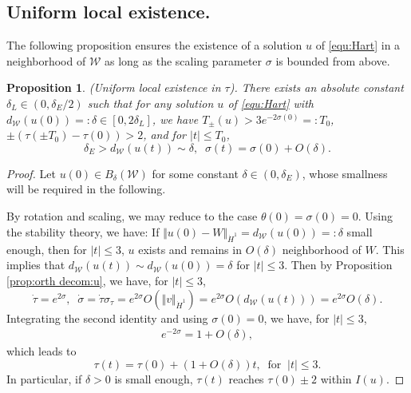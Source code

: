 \documentclass[reqno, 11pt]{amsart}
\numberwithin{equation}{section}
\theoremstyle{plain}
\newtheorem{proposition}[theorem]{Proposition}
\theoremstyle{definition}
\numberwithin{equation}{section}
\numberwithin{theorem}{section}
\numberwithin{equation}{section}
\numberwithin{equation}{section}
\numberwithin{theorem}{section}
\begin{document}
	\subsection{Uniform local existence.}
	The following proposition ensures the existence of a solution $u$ of \eqref{equ:Hart} in a neighborhood of $\mathcal{W}$ as long as the scaling parameter $\sigma$ is bounded from above.
	\begin{proposition}(Uniform local existence in $\tau$)\label{prop:unif lwp}. There exists an absolute constant $\delta_L\in(0,\delta_{E}/2)$ such that for any solution $u$ of \eqref{equ:Hart} with $d_{\mathcal{W}}(u(0))=:\delta\in\left[ 0,2\delta_L \right]$, we have $T_{\pm}(u)>3e^{-2\sigma(0)}=:T_0$, $\pm\left( \tau(\pm T_0)-\tau(0) \right)>2$, and for $|t|\leq T_0$,
		\begin{equation*}
		\delta_{E}>d_{\mathcal{W}}(u(t))\sim\delta,\;\; \sigma(t)=\sigma(0)+O(\delta).
		\end{equation*}
	\end{proposition}
	\begin{proof} Let $u(0)\in B_\delta(\mathcal{W})$ for some constant $\delta\in(0,\delta_{E})$, whose smallness will be required in the following. 
		
		By rotation and scaling, we may reduce to the case $\theta(0)=\sigma(0)=0$. Using the stability theory, we have: If $\Vert u(0)-W \Vert_{\dot H^1}=d_\mathcal{W}(u(0))=:\delta$ small enough, then for $|t|\leq3$, $u$ exists and remains in $O(\delta)$ neighborhood of $W$. This implies that $d_\mathcal{W}(u(t))\sim d_\mathcal{W}(u(0))=\delta$ for $|t|\leq3$. Then by Proposition \ref{prop:orth decom:u}, we have, for $|t|\leq3$,
		\begin{equation*}
		\dot\tau=e^{2\sigma},\;\; \dot\sigma=\dot\tau\sigma_{\tau}=e^{2\sigma}O(\Vert v \Vert_{\dot H^1})=e^{2\sigma}O(d_\mathcal{W}(u(t)))=e^{2\sigma}O(\delta).
		\end{equation*}
		Integrating the second identity and using $\sigma(0)=0$, we have, for $|t|\leq3$,
		\begin{align*}
		e^{-2\sigma}=1+O(\delta),
		\end{align*}
		which leads to 
		\begin{equation*}
		\tau(t)=\tau(0)+\left( 1+O(\delta) \right)t,\;\;\text{for}\;\;|t|\leq3.
		\end{equation*}
		In particular, if $\delta>0$ is small enough, $\tau(t)$ reaches $\tau(0)\pm2$ within $I(u)$.
	\end{proof}
	
\end{document}
